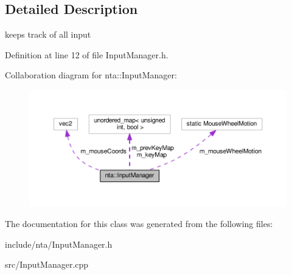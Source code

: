\subsection{Detailed Description}
keeps track of all input 

Definition at line 12 of file Input\+Manager.\+h.



Collaboration diagram for nta\+:\+:Input\+Manager\+:
\nopagebreak
\begin{figure}[H]
\begin{center}
\leavevmode
\includegraphics[width=350pt]{dc/d97/classnta_1_1InputManager__coll__graph}
\end{center}
\end{figure}


The documentation for this class was generated from the following files\+:\begin{DoxyCompactItemize}
\item 
include/nta/Input\+Manager.\+h\item 
src/Input\+Manager.\+cpp\end{DoxyCompactItemize}

